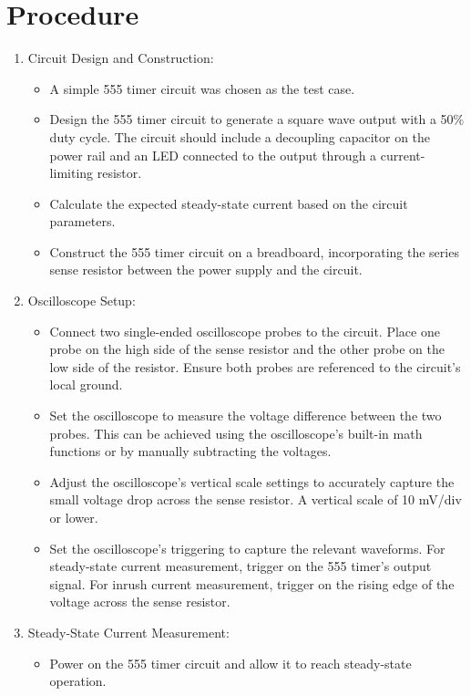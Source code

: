 \documentclass[a4paper,11pt]{article}%
\begin{document}
\section{Procedure}
\begin{enumerate}
	\item Circuit Design and Construction:
	      \begin{itemize}
		      \item A simple 555 timer circuit was chosen as the test case.
		      \item Design the 555 timer circuit to generate a square wave output with a 50\% duty cycle. The circuit should include a decoupling capacitor on the power rail and an LED connected to the output through a current-limiting resistor.
		      \item Calculate the expected steady-state current based on the circuit parameters.
		      \item Construct the 555 timer circuit on a breadboard, incorporating the series sense resistor between the power supply and the circuit.
	      \end{itemize}
	\item Oscilloscope Setup:
	      \begin{itemize}
		      \item Connect two single-ended oscilloscope probes to the circuit. Place one probe on the high side of the sense resistor and the other probe on the low side of the resistor. Ensure both probes are referenced to the circuit's local ground.
		      \item Set the oscilloscope to measure the voltage difference between the two probes. This can be achieved using the oscilloscope's built-in math functions or by manually subtracting the voltages.
		      \item Adjust the oscilloscope's vertical scale settings to accurately capture the small voltage drop across the sense resistor. A vertical scale of 10 mV/div or lower.
		      \item Set the oscilloscope's triggering to capture the relevant waveforms. For steady-state current measurement, trigger on the 555 timer's output signal. For inrush current measurement, trigger on the rising edge of the voltage across the sense resistor.
	      \end{itemize}
	\item Steady-State Current Measurement:
	      \begin{itemize}
		      \item Power on the 555 timer circuit and allow it to reach steady-state operation.

\end{itemize}
\end{enumerate}
\end{document}
